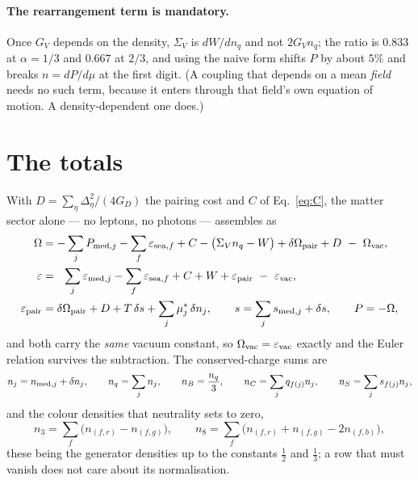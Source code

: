 \documentclass[aps,prc,onecolumn,superscriptaddress,nofootinbib,10pt]{revtex4-2}
\newcommand{\nB}{n_B}
\newcommand{\nC}{n_C}
\newcommand{\nS}{n_S}
\newcommand{\nq}{n_q}
\newcommand{\GD}{G_D}
\newcommand{\GV}{G_V}
\begin{document}
\paragraph{The rearrangement term is mandatory.} Once $\GV$ depends on the
density, $\Sigma_V$ is $dW/d\nq$ and not $2\GV \nq$; the ratio is $0.833$ at
$\alpha = 1/3$ and $0.667$ at $2/3$, and using the naive form shifts $P$ by
about $5\%$ and breaks $n = dP/d\mu$ at the first digit. (A coupling that
depends on a mean \emph{field} needs no such term, because it enters through
that field's own equation of motion. A density-dependent one does.)

\section{The totals}
\label{sec:totals}

With $D = \sum_\eta \Delta_\eta^2/(4\GD)$ the pairing cost and $C$ of
Eq.~\eqref{eq:C}, the matter sector alone --- no leptons, no photons ---
assembles as
\begin{align}
  \Omega &= -\sum_j P_{{\rm med},j} - \sum_f \varepsilon_{{\rm sea},f}
            + C - \big(\Sigma_V \nq - W\big)
            + \delta\Omega_{\rm pair} + D
            \ -\ \Omega_{\rm vac} ,
  \label{eq:Omega}\\
  \varepsilon &= \ \ \sum_j \varepsilon_{{\rm med},j}
            - \sum_f \varepsilon_{{\rm sea},f}
            + C + W + \varepsilon_{\rm pair}
            \ -\ \varepsilon_{\rm vac} ,
  \label{eq:eps}\\
  \varepsilon_{\rm pair} &= \delta\Omega_{\rm pair} + D
            + T\,\delta s + \sum_j \mu^{*}_j\, \delta n_j ,
  \qquad
  s = \sum_j s_{{\rm med},j} + \delta s ,
  \qquad
  P = -\Omega ,
  \label{eq:epspair}
\end{align}
and both carry the \emph{same} vacuum constant, so
$\Omega_{\rm vac} = \varepsilon_{\rm vac}$ exactly and the Euler relation
survives the subtraction. The conserved-charge sums are
\begin{equation}
  n_j = n_{{\rm med},j} + \delta n_j, \qquad
  \nq = \sum_j n_j , \qquad
  \nB = \frac{\nq}{3} , \qquad
  \nC = \sum_j q_{f(j)} n_j , \qquad
  \nS = \sum_j s_{f(j)} n_j ,
  \label{eq:charges}
\end{equation}
and the colour densities that neutrality sets to zero,
\begin{equation}
  n_3 = \sum_f \big(n_{(f,r)} - n_{(f,g)}\big) , \qquad
  n_8 = \sum_f \big(n_{(f,r)} + n_{(f,g)} - 2 n_{(f,b)}\big) ,
  \label{eq:colourdens}
\end{equation}
these being the generator densities up to the constants $\tfrac12$ and
$\tfrac13$; a row that must vanish does not care about its normalisation.
\end{document}
